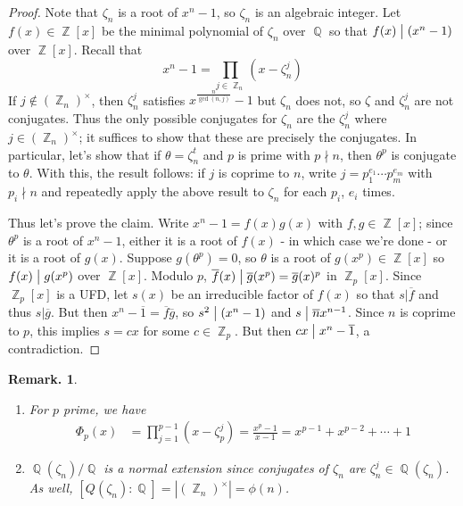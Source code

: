 \documentclass[11pt, a4paper]{memoir}
\DeclareMathOperator{\Q}{{\mathbb{Q}}}
\DeclareMathOperator{\Z}{{\mathbb{Z}}}
\renewcommand{\div}{\bigm|}
\newcommand{\ol}[1]{\ensuremath{\overline{#1}}}
\theoremstyle{change}
\theoremstyle{plain}
\theoremstyle{nonumberplain}
\newtheorem{remark}{Remark.}
\newtheorem{proof}{Proof}
\numberwithin{equation}{section}
\begin{document}
\begin{proof}
    Note that $\zeta_n$ is a root of $x^n-1$, so $\zeta_n$ is an algebraic integer.
    Let $f(x)\in\Z[x]$ be the minimal polynomial of $\zeta_n$ over $\Q$ so that $f(x)\div(x^n-1)$ over $\Z[x]$.
    Recall that
    \begin{equation*}
        x^n-1=\prod\limits_{j\in\Z_n}(x-\zeta_n^j)
    \end{equation*}
    If $j\notin(\Z_n)^\times$, then $\zeta_n^j$ satisfies $x^{\frac{n}{\gcd(n,j)}}-1$ but $\zeta_n$ does not, so $\zeta$ and $\zeta_n^j$ are not conjugates.
    Thus the only possible conjugates for $\zeta_n$ are the $\zeta_n^j$ where $j\in(\Z_n)^\times$; it suffices to show that these are precisely the conjugates.
    In particular, let's show that if $\theta=\zeta_n^t$ and $p$ is prime with $p\nmid n$, then $\theta^p$ is conjugate to $\theta$.
    With this, the result follows: if $j$ is coprime to $n$, write $j=p_1^{e_1}\cdots p_m^{e_m}$ with $p_i\nmid n$ and repeatedly apply the above result to $\zeta_n$ for each $p_i$, $e_i$ times.

    Thus let's prove the claim.
    Write $x^n-1=f(x)g(x)$ with $f,g\in\Z[x]$; since $\theta^p$ is a root of $x^n-1$, either it is a root of $f(x)$ - in which case we're done - or it is a root of $g(x)$.
    Suppose $g(\theta^p)=0$, so $\theta$ is a root of $g(x^p)\in\Z[x]$ so $f(x)\div g(x^p)$ over $\Z[x]$.
    Modulo $p$, $\ol{f}(x)\div\ol{g}(x^p)=\ol{g}(x)^p$ in $\Z_p[x]$.
    Since $\Z_p[x]$ is a UFD, let $s(x)$ be an irreducible factor of $f(x)$ so that $s|\ol{f}$ and thus $s|\ol{g}$.
    But then $x^{n}-\ol{1}=\ol{f}\ol{g}$, so $s^2\div(x^n-1)$ and $s\div\ol{n}x^{n-1}$.
    Since $n$ is coprime to $p$, this implies $s=cx$ for some $c\in\Z_p$.
    But then $cx\div x^n-\ol{1}$, a contradiction.
\end{proof}
\begin{remark}
    \begin{enumerate}[nl]
        \item For $p$ prime, we have
            \begin{align*}
                \Phi_p(x) &= \prod\limits_{j=1}^{p-1}(x-\zeta_p^j)= \frac{x^p-1}{x-1}= x^{p-1}+x^{p-2}+\cdots+1
            \end{align*}
        \item $\Q(\zeta_n)/\Q$ is a normal extension since conjugates of $\zeta_n$ are $\zeta_n^j\in\Q(\zeta_n)$.
            As well, $[Q(\zeta_n):\Q]=|(\Z_n)^\times|=\phi(n)$.
    \end{enumerate}
\end{remark}
\end{document}
